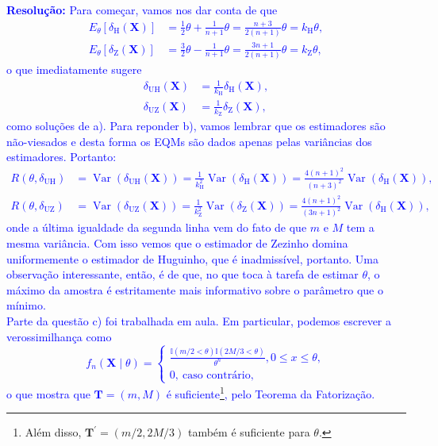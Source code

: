 \documentclass[a4paper,10pt, notitlepage]{report}
\newcommand{\vr}{\operatorname{Var}} %
\newcommand{\bX}{\boldsymbol{X}} %
\begin{document}
\textcolor{blue}{
\textbf{Resolução:} Para começar, vamos nos dar conta de que 
\begin{align*}
 E_\theta\left[\delta_{\text{H}}(\bX)\right] &= \frac{1}{2}\theta + \frac{1}{n+1}\theta = \frac{n+3}{2(n+1)} \theta = k_{\text{H}}\theta,\\
 E_\theta\left[\delta_{\text{Z}}(\bX) \right] &= \frac{3}{2}\theta - \frac{1}{n+1}\theta = \frac{3n + 1}{2(n+1)}\theta = k_{\text{Z}}\theta,
\end{align*}
o que imediatamente sugere
\begin{align*}
 \delta_{\text{UH}}(\bX) &= \frac{1}{k_{\text{H}}}\delta_{\text{H}}(\bX),\\
\delta_{\text{UZ}}(\bX) &= \frac{1}{k_{\text{Z}}}\delta_{\text{Z}}(\bX),
\end{align*}
como soluções de a).
Para reponder b), vamos lembrar que os estimadores são não-viesados e desta forma os EQMs são dados apenas pelas variâncias dos estimadores.
Portanto:
\begin{align*}
R\left(\theta, \delta_{\text{UH}}\right) &= \vr\left(\delta_{\text{UH}}(\bX)\right) = \frac{1}{k_{\text{H}}^2}\vr\left( \delta_{\text{H}}(\bX)\right) = \frac{4(n+1)^2}{(n+3)^2}\vr\left( \delta_{\text{H}}(\bX)\right),\\
R\left(\theta, \delta_{\text{UZ}}\right) &= \vr\left(\delta_{\text{UZ}}(\bX)\right) = \frac{1}{k_{\text{Z}}^2}\vr\left( \delta_{\text{Z}}(\bX)\right) = \frac{4(n+1)^2}{(3n+1)^2}\vr\left( \delta_{\text{H}}(\bX)\right),
\end{align*}
onde a última igualdade da segunda linha vem do fato de que $m$ e $M$ tem a mesma variância. 
Com isso vemos que o estimador de Zezinho domina uniformemente o estimador de Huguinho, que é inadmissível, portanto.
Uma observação interessante, então, é de que, no que toca à tarefa de estimar $\theta$, o máximo da amostra é estritamente mais informativo sobre o parâmetro que o mínimo.
\\
Parte da questão c) foi trabalhada em aula.
Em particular, podemos escrever a verossimilhança como
$$
f_n(\bX \mid \theta) =  \begin{cases}
     \frac{\mathbb{I}\left( m/2 < \theta\right)\mathbb{I}\left(2M/3 < \theta\right)}{\theta^n}, 0 \leq x \leq \theta,\\
     0,\:\text{caso contrário},
\end{cases}
$$
o que mostra que $\boldsymbol{T} = (m, M)$ é suficiente\footnote{Além disso, $\boldsymbol{T}^\prime = (m/2, 2M/3)$ também é suficiente para $\theta$.}, pelo Teorema da Fatorização.
}
\end{document}
